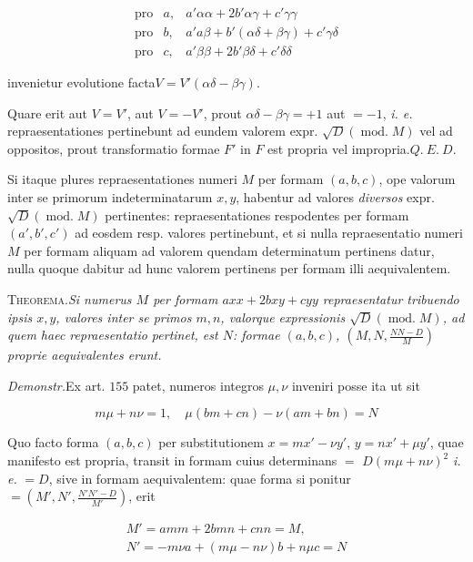 \[
\begin{array}{lll}\text{pro}&a,&a'\alpha\alpha+2b'\alpha\gamma+c'\gamma\gamma\\\text{pro}&b,&a'a\beta+b'(\alpha\delta+\beta\gamma)+c'\gamma\delta\\\text{pro}&c,&a'\beta\beta+2b'\beta\delta+c'\delta\delta\end{array}
\]

invenietur evolutione facta\quad $V=V'(\alpha\delta-\beta\gamma).$

Quare erit aut $V=V'$, aut $V=-V'$, prout $\alpha\delta-\beta\gamma=+1$ aut $=-1$, \emph{i. e.} repraesentationes pertinebunt ad eundem valorem expr. $\surd D(\operatorname{mod.}M)$ vel ad oppositos, prout transformatio formae $F'$ in $F$ est propria vel impropria.\quad $Q.\ E.\ D.$

Si itaque plures repraesentationes numeri $M$ per formam $(a,b,c)$, ope valorum inter se primorum indeterminatarum $x,y$, habentur ad valores \emph{diversos} expr. $\surd D(\operatorname{mod.}M)$ pertinentes: repraesentationes respodentes per formam $(a',b',c')$ ad eosdem resp. valores pertinebunt, et si nulla repraesentatio numeri $M$ per formam aliquam ad valorem quendam determinatum pertinens datur, nulla quoque dabitur ad hunc valorem pertinens per formam illi aequivalentem.



\textsc{Theorema.}\quad \emph{Si numerus $M$ per formam $axx+2bxy+cyy$ repraesentatur tribuendo ipsis $x,y$, valores inter se primos $m,n$, valorque expressionis $\surd D(\operatorname{mod.}M)$, ad quem haec repraesentatio pertinet, est $N$: formae $(a,b,c)$, $(M,N,\frac{NN-D}{M})$ proprie aequivalentes erunt.}

\emph{Demonstr.}\quad Ex art. $155$ patet, numeros integros $\mu,\nu$ inveniri posse ita ut sit

\[
m\mu+n\nu=1,\quad \mu(bm+cn)-\nu(am+bn)=N
\]

Quo facto forma $(a,b,c)$ per substitutionem $x=mx'-\nu y'$, $y=nx'+\mu y'$, quae manifesto est propria, transit in formam cuius determinans $=$ $D(m\mu+n\nu)^2$ \emph{i. e.} $=D$, sive in formam aequivalentem: quae forma si ponitur $=(M',N',\frac{N'N'-D}{M'})$, erit

\[
\begin{gathered}M'=amm+2bmn+cnn=M,\\N'=-m\nu a+(m\mu-n\nu)b+n\mu c=N\end{gathered}
\]

